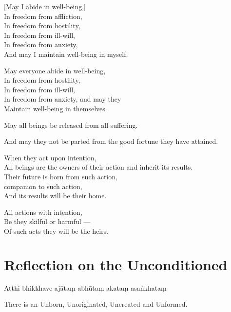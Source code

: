 
[May I abide in well-being,]\\
In freedom from affliction,\\
In freedom from hostility,\\
In freedom from ill-will,\\
In freedom from anxiety,\\
And may I maintain well-being in myself.

May everyone abide in well-being,\\
In freedom from hostility,\\
In freedom from ill-will,\\
In freedom from anxiety, and may they\\
Maintain well-being in themselves.

May all beings be released from all suffering.

And may they not be parted from the good fortune they have attained.

When they act upon intention,\\
All beings are the owners of their action and inherit its results.\\
Their future is born from such action,\\
companion to such action,\\
And its results will be their home.

All actions with intention,\\
Be they skilful or harmful ---\\
Of such acts they will be the heirs.


\section[The Unconditioned]{Reflection on the Unconditioned}

\begin{leader}
\end{leader}


Atthi bhikkhave ajātaṃ abhūtaṃ akataṃ asaṅkhataṃ

\begin{english}
  There is an Unborn, Unoriginated, Uncreated and Unformed.
\end{english}

